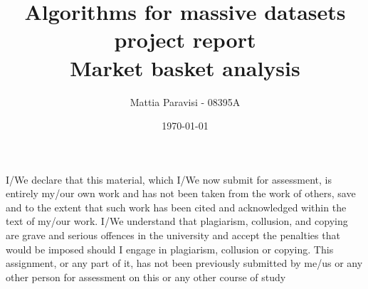 \documentclass[11pt]{article}
\title{Algorithms for massive datasets project report \\ \vspace{10px} \large Market basket analysis}
\author{ Mattia Paravisi - 08395A }
\date{\today}
\begin{document}
\maketitle
\begin{center}
    \vfill
            
    I/We declare that this material, which I/We now submit for assessment, is entirely my/our own work and has not been taken from the work of others, save and to the extent that such work has been cited and acknowledged within the text of my/our work. I/We understand that plagiarism, collusion, and copying are grave and serious offences in the university and accept the penalties that would be imposed should I engage in plagiarism, collusion or copying. This assignment, or any part of it, has not been previously submitted by me/us or any other person for assessment on this or any other course of study
         
    \vspace{0.8cm}
\end{center}
\pagebreak

\pagebreak








\end{document}
